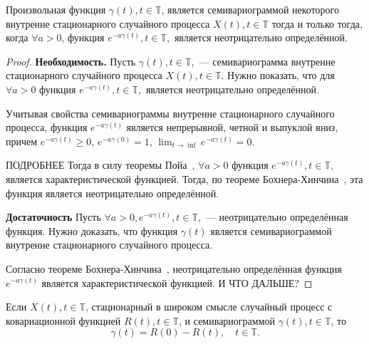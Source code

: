 \begin{Theorem}
	Произвольная функция $ \gamma(t), t \in \mathbb{T} $, является семивариограммой некоторого внутренне стационарного случайного процесса $ X(t), t \in \mathbb{T} $ тогда и только тогда, когда $ \forall a > 0 $, функция $ e^{-a \gamma(t)}, t \in \mathbb{T}, $ является неотрицательно определённой.
\end{Theorem}
\begin{proof}\textbf{Необходимость.}
	Пусть $ \gamma(t), t \in \mathbb{T}, $ --- семивариограмма внутренне стационарного случайного процесса $ X(t), t \in \mathbb{T} $. Нужно показать, что для $ \forall a > 0 $ функция $ e^{-a \gamma(t)}, t \in \mathbb{T}, $ является неотрицательно определённой.

	Учитывая свойства семивариограммы внутренне стационарного случайного процесса, функция $ e^{-a \gamma(t)} $ является непрерывной, четной и выпуклой вниз, причем $ e^{-a \gamma(t)} \ge 0 $, $ e^{-a \gamma(0)} = 1 $, $ \lim_{t \to \inf} e^{-a \gamma(t)} = 0 $.

	ПОДРОБНЕЕ Тогда в силу теоремы Пойа~\cite{shiryaev1980}, $ \forall a > 0 $ функция  $ e^{-a \gamma(t)}, t \in \mathbb{T}, $ является характеристической функцией. Тогда, по теореме Бохнера-Хинчина~\cite{shiryaev1980}, эта функция является неотрицательно определённой.

	\textbf{Достаточность}
	Пусть $ \forall a > 0, e^{-a \gamma(t)}, t \in \mathbb{T}, $ --- неотрицательно определённая функция. Нужно доказать, что функция $ \gamma(t) $ является семивариограммой внутренне стационарного случайного процесса.

	Согласно теореме Бохнера-Хинчина~\cite{shiryaev1980}, неотрицательно определённая функция $ e^{-a \gamma(t)} $ является характеристической функцией. И ЧТО ДАЛЬШЕ?

\end{proof}

\begin{Remark}
	Если $ X(t), t \in \mathbb{T} $, стационарный в широком смысле случайный процесс с ковариационной функцией $ R(t), t \in \mathbb{T} $, и семивариограммой $ \gamma(t), t \in \mathbb{T} $, то
	\begin{equation*}
		\gamma(t) = R(0) - R(t), \quad t \in \mathbb{T}.
	\end{equation*}
\end{Remark}

